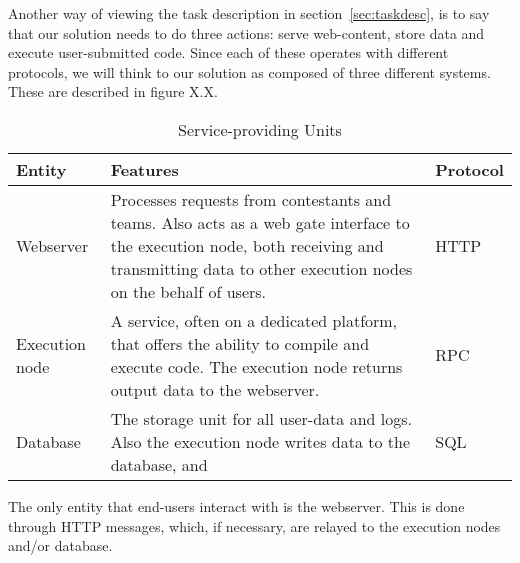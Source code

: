 Another way of viewing the task description in section~\ref{sec:taskdesc}, is to say
that our solution needs to do three actions: serve web-content, store
data and execute user-submitted code. Since each of these operates with
different protocols, we will think to our solution as composed of three
different systems. These are described in figure X.X.
\begin{table}
\caption{Service-providing Units}
\label{table:serviceUnits}
\tablehead{}
\begin{supertabular}{|m{0.2\textwidth}|m{0.6\textwidth}|m{0.2\textwidth}|}
\hline
Entity &
Features &
Protocol\\\hline
Webserver &
Processes requests from contestants and teams. Also acts as a web gate
interface to the execution node, both receiving and transmitting data
to other execution nodes on the behalf of users. &
HTTP\\\hline
Execution node &
A service, often on a dedicated platform, that offers the ability to
compile and execute code. The execution node returns output data to the
webserver. &
RPC\\\hline
Database &
The storage unit for all user{}-data and logs. Also the execution node
writes data to the database, and  &
SQL\\\hline
\end{supertabular}
\end{table}


The only entity that end-users interact with is the webserver. This is
done through HTTP messages, which, if necessary, are relayed to the
execution nodes and/or database. 


